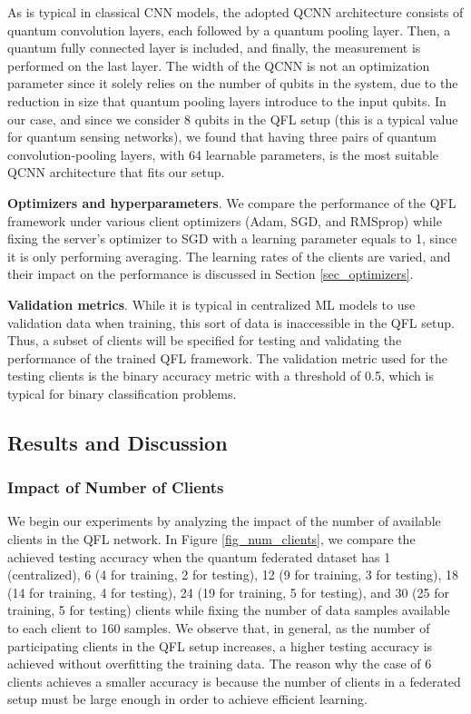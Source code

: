 \documentclass{article}
\begin{document}
As is typical in classical CNN models, the adopted QCNN architecture consists of quantum convolution layers, each followed by a quantum pooling layer. Then, a quantum fully connected layer is included, and finally, the measurement is performed on the last layer. The width of the QCNN is not an optimization parameter since it solely relies on the number of qubits in the system, due to the reduction in size that quantum pooling layers introduce to the input qubits. In our case, and since we consider 8 qubits in the QFL setup (this is a typical value for quantum sensing networks), we found that having three pairs of quantum convolution-pooling layers, with 64 learnable parameters, is the most suitable QCNN architecture that fits our setup.


\textbf{Optimizers and hyperparameters}. We compare the performance of the QFL framework under various client optimizers (Adam, SGD, and RMSprop) while fixing the server's optimizer to SGD with a learning parameter equals to 1, since it is only performing averaging. The learning rates of the clients are varied, and their impact on the performance is discussed in Section \ref{sec_optimizers}. 



\textbf{Validation metrics}. While it is typical in centralized ML models to use validation data when training, this sort of data is inaccessible in the QFL setup. Thus, a subset of clients will be specified for testing and validating the performance of the trained QFL framework. The validation metric used for the testing clients is the binary accuracy metric with a threshold of 0.5, which is typical for binary classification problems. 


\subsection{Results and Discussion}
\subsubsection{Impact of Number of Clients}
We begin our experiments by analyzing the impact of the number of available clients in the QFL network. In Figure \ref{fig_num_clients}, we compare the achieved testing accuracy when the quantum federated dataset has 1 (centralized), 6 (4 for training, 2 for testing), 12 (9 for training, 3 for testing), 18 (14 for training, 4 for testing), 24 (19 for training, 5 for testing), and 30 (25 for training, 5 for testing) clients while fixing the number of data samples available to each client to 160 samples. We observe that, in general, as the number of participating clients in the QFL setup increases, a higher testing accuracy is achieved without overfitting the training data. The reason why the case of 6 clients achieves a smaller accuracy is because the number of clients in a federated setup must be large enough in order to achieve efficient learning.
\end{document}

